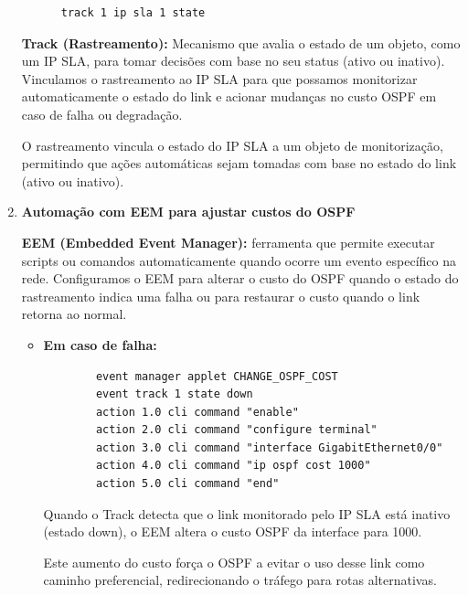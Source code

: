 \documentclass[11pt,english, openright, oneside]{book}
\begin{document}
\begin{enumerate}
    \begin{verbatim}
      track 1 ip sla 1 state
    \end{verbatim}

    \textbf{Track (Rastreamento):} Mecanismo que avalia o estado de um objeto, como um IP SLA, para tomar decisões com base no seu status (ativo ou inativo). Vinculamos o rastreamento ao IP SLA para que possamos monitorizar automaticamente o estado do link e acionar mudanças no custo OSPF em caso de falha ou degradação. \par \vspace{0.2cm}

    O rastreamento vincula o estado do IP SLA a um objeto de monitorização, permitindo que ações automáticas sejam tomadas com base no estado do link (ativo ou inativo).

    \pagebreak
  \item \textbf{Automação com EEM para ajustar custos do OSPF}
    \par \vspace{0.2cm}

    \textbf{EEM (Embedded Event Manager):} ferramenta que permite executar scripts ou comandos automaticamente quando ocorre um evento específico na rede. Configuramos o EEM para alterar o custo do OSPF quando o estado do rastreamento indica uma falha ou para restaurar o custo quando o link retorna ao normal.

    \vspace{0.2cm}
    \begin{itemize}
      \item \textbf{Em caso de falha:}
      \begin{verbatim}
        event manager applet CHANGE_OSPF_COST
        event track 1 state down
        action 1.0 cli command "enable"
        action 2.0 cli command "configure terminal"
        action 3.0 cli command "interface GigabitEthernet0/0"
        action 4.0 cli command "ip ospf cost 1000"
        action 5.0 cli command "end"
      \end{verbatim}

      Quando o Track detecta que o link monitorado pelo IP SLA está inativo (estado down), o EEM altera o custo OSPF da interface para 1000. \par
      Este aumento do custo força o OSPF a evitar o uso desse link como caminho preferencial, redirecionando o tráfego para rotas alternativas.

      \vspace{0.8cm}


\end{itemize}
\end{enumerate}
\end{document}
